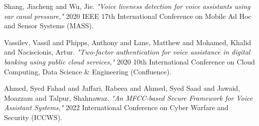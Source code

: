 \documentclass[conference]{IEEEtran}
\begin{document}
\begin{thebibliography}{20}
Shang, Jiacheng and Wu, Jie. \emph{"Voice liveness detection for voice assistants using ear canal pressure,"} 2020 IEEE 17th International Conference on Mobile Ad Hoc and Sensor Systems (MASS).

Vassilev, Vassil and Phipps, Anthony and Lane, Matthew and Mohamed, Khalid and Naciscionis, Artur. \emph{"Two-factor authentication for voice assistance in digital banking using public cloud services,"} 2020 10th International Conference on Cloud Computing, Data Science \& Engineering (Confluence).

Ahmed, Syed Fahad and Jaffari, Rabeea and Ahmed, Syed Saad and Jawaid, Moazzam and Talpur, Shahnawaz. \emph{"An MFCC-based Secure Framework for Voice Assistant Systems,"} 2022 International Conference on Cyber Warfare and Security (ICCWS).

\end{thebibliography}


\end{document}
